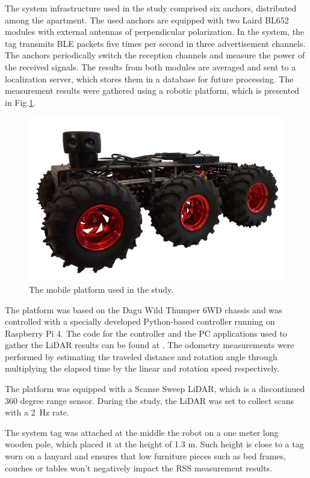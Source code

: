 \documentclass[conference]{IEEEtran}
\begin{document}
The system infrastructure used in the study comprised six anchors, distributed among the apartment. The used anchors are equipped with two Laird BL652 modules with external antennas of perpendicular polarization. In the system, the tag transmits BLE packets five times per second in three advertisement channels. The anchors periodically switch the reception channels and measure the power of the received signals. The results from both modules are averaged and sent to a localization server, which stores them in a database for future processing. The measurement results were gathered using a robotic platform, which is presented in Fig.\ref{fig:robot}.

\begin{figure}[h]
\centering
\includegraphics[width=0.8\columnwidth]{figs/robot}
\caption{\label{fig:robot}The mobile platform used in the study.}
\end{figure}


The platform was based on the Dagu Wild Thumper 6WD chassis and was controlled with a specially developed Python-based controller running on Raspberry Pi 4. The code for the controller and the PC applications used to gather the LiDAR results can be found at \cite{c2}.  The odometry measurements were performed by estimating the traveled distance and rotation angle through multiplying the elapsed time by the linear and rotation speed respectively.

The platform was equipped with a Scanse Sweep LiDAR, which is a discontinued 360 degree range sensor. During the study, the LiDAR was set to collect scans with a 2~Hz rate.

The system tag was attached at the middle the robot on a one meter long wooden pole, which placed it at the height of 1.3 m. Such height is close to a tag worn on a lanyard and ensures that low furniture pieces such as bed frames, couches or tables won't negatively impact the RSS measurement results.
\end{document}
